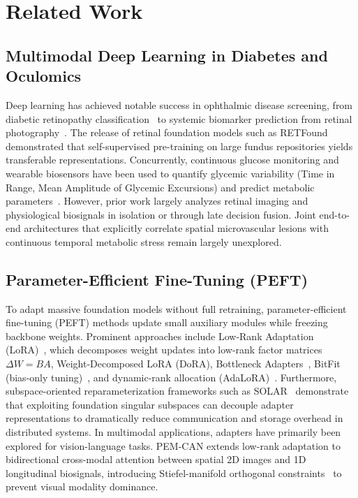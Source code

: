 \documentclass[a4paper,fleqn]{cas-dc}
\begin{document}
\section{Related Work}
\label{sec:related_work}

\subsection{Multimodal Deep Learning in Diabetes and Oculomics}
Deep learning has achieved notable success in ophthalmic disease screening, from diabetic retinopathy classification~\cite{gulshan2016development,ting2017development} to systemic biomarker prediction from retinal photography~\cite{poplin2018prediction,wagner2020insights}. The release of retinal foundation models such as RETFound~\cite{zhou2023retfound} demonstrated that self-supervised pre-training on large fundus repositories yields transferable representations. Concurrently, continuous glucose monitoring and wearable biosensors have been used to quantify glycemic variability (Time in Range, Mean Amplitude of Glycemic Excursions) and predict metabolic parameters~\cite{danne2017international,battelino2023continuous,dunn2021wearable}. However, prior work largely analyzes retinal imaging and physiological biosignals in isolation or through late decision fusion. Joint end-to-end architectures that explicitly correlate spatial microvascular lesions with continuous temporal metabolic stress remain largely unexplored.

\subsection{Parameter-Efficient Fine-Tuning (PEFT)}
To adapt massive foundation models without full retraining, parameter-efficient fine-tuning (PEFT) methods update small auxiliary modules while freezing backbone weights. Prominent approaches include Low-Rank Adaptation (LoRA)~\cite{hu2022lora}, which decomposes weight updates into low-rank factor matrices $\Delta W = BA$, Weight-Decomposed LoRA (DoRA), Bottleneck Adapters~\cite{houlsby2019parameter}, BitFit (bias-only tuning)~\cite{zaken2022bitfit}, and dynamic-rank allocation (AdaLoRA)~\cite{zhang2023adalora}. Furthermore, subspace-oriented reparameterization frameworks such as SOLAR~\cite{sajjadi2026solar} demonstrate that exploiting foundation singular subspaces can decouple adapter representations to dramatically reduce communication and storage overhead in distributed systems. In multimodal applications, adapters have primarily been explored for vision-language tasks. PEM-CAN extends low-rank adaptation to bidirectional cross-modal attention between spatial 2D images and 1D longitudinal biosignals, introducing Stiefel-manifold orthogonal constraints~\cite{edelman1998geometry} to prevent visual modality dominance.
\end{document}
